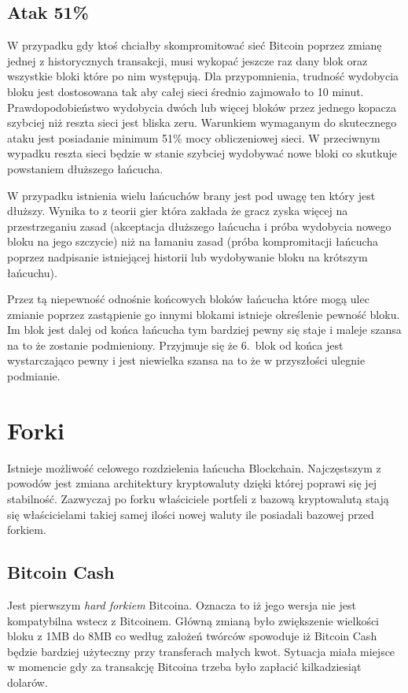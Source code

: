 \documentclass[journal,12pt,onecolumn,draftclsnofoot,]{IEEEtran}
\begin{document}
\subsection{Atak 51\%}

W przypadku gdy ktoś chciałby skompromitować sieć Bitcoin poprzez zmianę jednej z historycznych transakcji, musi wykopać
jeszcze raz dany blok oraz wszystkie bloki które po nim występują. Dla przypomnienia, trudność wydobycia bloku jest
dostosowana tak aby całej sieci średnio zajmowało to 10 minut. Prawdopodobieństwo wydobycia dwóch lub więcej bloków
przez jednego kopacza szybciej niż reszta sieci jest bliska zeru. Warunkiem wymaganym do skutecznego ataku jest
posiadanie minimum 51\% mocy obliczeniowej sieci. W przeciwnym wypadku reszta sieci będzie w stanie szybciej wydobywać
nowe bloki co skutkuje powstaniem dłuższego łańcucha.

W przypadku istnienia wielu łańcuchów brany jest pod uwagę ten który jest dłuższy. Wynika to z teorii gier która zakłada
że gracz zyska więcej na przestrzeganiu zasad (akceptacja dłuższego łańcucha i próba wydobycia nowego bloku na jego
szczycie) niż na łamaniu zasad (próba kompromitacji łańcucha poprzez nadpisanie istniejącej historii lub wydobywanie
bloku na krótszym łańcuchu).

Przez tą niepewność odnośnie końcowych bloków łańcucha które mogą ulec zmianie poprzez zastąpienie go innymi blokami
istnieje określenie pewność bloku. Im blok jest dalej od końca łańcucha tym bardziej pewny się staje i maleje szansa na
to że zostanie podmieniony. Przyjmuje się że 6.\ blok od końca jest wystarczająco pewny i jest niewielka szansa na to że
w przyszłości ulegnie podmianie.

\section{Forki}

Istnieje możliwość celowego rozdzielenia łańcucha Blockchain. Najczęstszym z powodów jest zmiana architektury
kryptowaluty dzięki której poprawi się jej stabilność. Zazwyczaj po forku właściciele portfeli z bazową kryptowalutą
stają się właścicielami takiej samej ilości nowej waluty ile posiadali bazowej przed forkiem.

\subsection{Bitcoin Cash}

Jest pierwszym \textit{hard forkiem} Bitcoina. Oznacza to iż jego wersja nie jest kompatybilna wstecz z Bitcoinem.
Główną zmianą było zwiększenie wielkości bloku z 1MB do 8MB co według założeń twórców spowoduje iż Bitcoin Cash będzie
bardziej użyteczny przy transferach małych kwot. Sytuacja miała miejsce w momencie gdy za transakcję Bitcoina trzeba
było zapłacić kilkadziesiąt dolarów.
\end{document}
